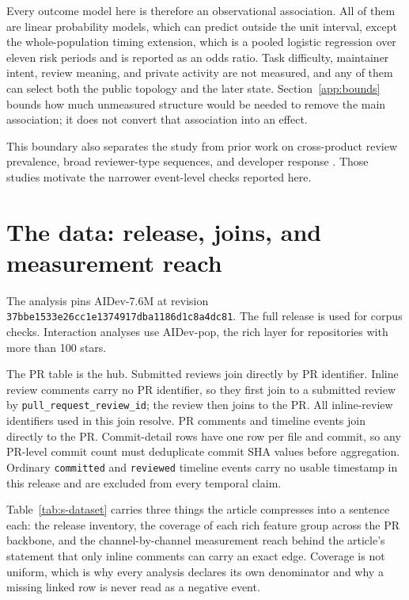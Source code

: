 \documentclass[pdflatex,sn-basic]{sn-jnl}
\begin{document}
Every outcome model here is therefore an observational association. All of them
are linear probability models, which can predict outside the unit interval,
except the whole-population timing extension, which is a pooled logistic
regression over eleven risk periods and is reported as an odds ratio.
Task difficulty, maintainer intent, review meaning, and private activity are not
measured, and any of them can select both the public topology and the later
state. Section~\ref{app:bounds} bounds how much unmeasured structure would be
needed to remove the main association; it does not convert that association into
an effect.

This boundary also separates the study from prior work on cross-product review
prevalence, broad reviewer-type sequences, and developer response
\citep{selvanayagam2026a2a,zhong2026agenticreview,cynthia2026responses}. Those
studies motivate the narrower event-level checks reported here.

\section{The data: release, joins, and measurement reach}\label{app:data}

The analysis pins AIDev-7.6M at revision
\nolinkurl{37bbe1533e26cc1e1374917dba1186d1c8a4dc81}. The full release is used
for corpus checks. Interaction analyses use AIDev-pop, the rich layer for
repositories with more than 100 stars.

The PR table is the hub. Submitted reviews join directly by PR identifier.
Inline review comments carry no PR identifier, so they first join to a submitted
review by \texttt{pull\_request\_review\_id}; the review then joins to the PR.
All inline-review identifiers used in this join resolve. PR comments and
timeline events join directly to the PR. Commit-detail rows have one row per
file and commit, so any PR-level commit count must deduplicate commit SHA values
before aggregation. Ordinary \texttt{committed} and \texttt{reviewed} timeline
events carry no usable timestamp in this release and are excluded from every
temporal claim.

Table~\ref{tab:s-dataset} carries three things the article compresses into a
sentence each: the release inventory, the coverage of each rich feature group
across the PR backbone, and the channel-by-channel measurement reach behind the
article's statement that only inline comments can carry an exact edge. Coverage
is not uniform, which is why every analysis declares its own denominator and
why a missing linked row is never read as a negative event.
\end{document}
